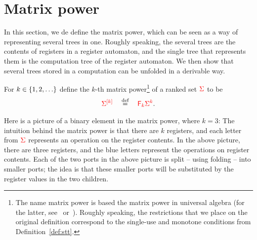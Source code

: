 
\section{Matrix power} 
\label{sec:matrix-power}
In this section, we de define the matrix power, which can be seen as a way of representing several trees in one. Roughly speaking, the several trees are the contents of registers in a register automaton, and the single tree that represents them is the computation tree of the register automaton.  We then show that several trees stored in a computation  can be unfolded in a derivable way. 

\begin{definition}
     For $k \in \{1,2,\ldots\}$ define the $k$-th matrix power\footnote{
        The name  matrix power is based the matrix power in  universal algebra (for the latter, see~\cite{Taylor1975} or~\cite{szendrei1990simple}). Roughly speaking, the restrictions that we place on the original definition correspond to the single-use and monotone conditions from Definition~\ref{def:stt}. 
     } of a ranked set ${\color{red}{\Sigma}}$ 
to be 
\begin{align*}
 {\color{red}{\Sigma}}^{{\color{red}{[k]}}} \quad \stackrel{\text{def}}= \quad {\color{red}{{\color{red}{\mathsf F_{k}}}{\color{red}{\Sigma}}^k}}.
\end{align*}
\end{definition}

Here is a picture of a binary element in the matrix power, where $k=3$:
The intuition behind the matrix power is that there are $k$ registers, and each letter from ${\color{red}{\Sigma}}$ represents an operation on the register contents.  In the above picture, there are three registers, and the blue letters represent the operations on  register contents. Each of the two ports in the above picture is split -- using folding -- into smaller ports; the idea is that these smaller ports will be substituted by the register values in the two children.  

